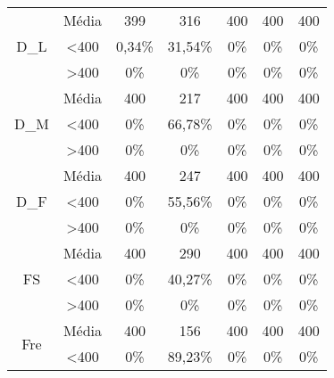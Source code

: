 \begin{table}[]
\begin{tabular}{|c|c|ccccc|}
\multirow{3}{*}{D\_L}           & Média            & 399               & 316               & 400               & 400               & 400               \\
                                & \textless 400    & 0,34\%            & 31,54\%           & 0\%            & 0\%            & 0\%            \\
                                & \textgreater 400 & 0\%            & 0\%            & 0\%            & 0\%            & 0\%            \\ \hline
\multirow{3}{*}{D\_M}           & Média            & 400               & 217               & 400               & 400               & 400               \\
                                & \textless 400    & 0\%            & 66,78\%           & 0\%            & 0\%            & 0\%            \\
                                & \textgreater 400 & 0\%            & 0\%            & 0\%            & 0\%            & 0\%            \\ \hline
\multirow{3}{*}{D\_F}           & Média            & 400               & 247               & 400               & 400               & 400               \\
                                & \textless 400    & 0\%            & 55,56\%           & 0\%            & 0\%            & 0\%            \\
                                & \textgreater 400 & 0\%            & 0\%            & 0\%            & 0\%            & 0\%            \\ \hline
\multirow{3}{*}{FS}             & Média            & 400               & 290               & 400               & 400               & 400               \\
                                & \textless 400    & 0\%            & 40,27\%           & 0\%            & 0\%            & 0\%            \\
                                & \textgreater 400 & 0\%            & 0\%            & 0\%            & 0\%            & 0\%            \\ \hline
\multirow{3}{*}{Fre}            & Média            & 400               & 156               & 400               & 400               & 400               \\
                                & \textless 400    & 0\%            & 89,23\%           & 0\%            & 0\%            & 0\%            \\

\end{tabular}
\end{table}
